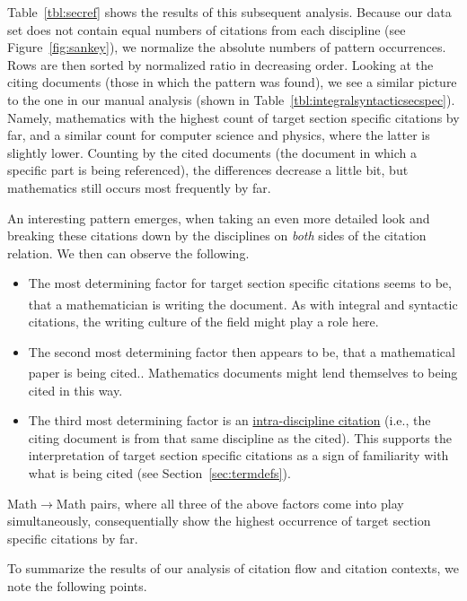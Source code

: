 Table~\ref{tbl:secref} shows the results of this subsequent analysis. Because our data set does not contain equal numbers of citations from each discipline (see Figure~\ref{fig:sankey}), we normalize the absolute numbers of pattern occurrences. Rows are then sorted by normalized ratio in decreasing order. Looking at the citing documents (those in which the pattern was found), we see a similar picture to the one in our manual analysis (shown in Table~\ref{tbl:integralsyntacticsecspec}). Namely, mathematics with the highest count of target section specific citations by far, and a similar count for computer science and physics, where the latter is slightly lower. Counting by the cited documents (the document in which a specific part is being referenced), the differences decrease a little bit, but mathematics still occurs most frequently by far.

An interesting pattern emerges, when taking an even more detailed look and breaking these citations down by the disciplines on \emph{both} sides of the citation relation. We then can observe the following.
\begin{itemize}
 \item The most determining factor for target section specific citations seems to be, that a mathematician is writing the document.\textsuperscript{\textdagger} As with integral and syntactic citations, the writing culture of the field might play a role here.
 \item The second most determining factor then appears to be, that a mathematical paper is being cited.\textsuperscript{\textdaggerdbl}. Mathematics documents might lend themselves to being cited in this way.
 \item The third most determining factor is an \underline{intra-discipline citation} (i.e., the citing document is from that same discipline as the cited). This supports the interpretation of target section specific citations as a sign of familiarity with what is being cited (see Section~\ref{sec:termdefs}).
\end{itemize}

Math$\rightarrow$Math pairs, where all three of the above factors come into play simultaneously, consequentially show the highest occurrence of target section specific citations by far.

To summarize the results of our analysis of citation flow and citation contexts, we note the following points.

